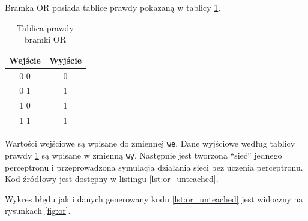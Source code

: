 \documentclass[pointlessnumbers, abstracton, headsepline, a4paper]{scrartcl}
\begin{document}
Bramka OR posiada tablice prawdy pokazaną w tablicy \ref{tab:or}.

\begin{table}[h]
\centering
\begin{tabular}[t]{c|c}
Wejście & Wyjście \\
\hline
0 0 & 0 \\
0 1 & 1 \\
1 0 & 1 \\
1 1 & 1 \\
\end{tabular}
\caption{\label{tab:or}Tablica prawdy bramki OR}
\end{table}

Wartości wejściowe są wpisane do zmiennej \texttt{we}. Dane wyjściowe według tablicy prawdy \ref{tab:or} są wpisane w zmienną \texttt{wy}. Następnie jest tworzona ``sieć'' jednego perceptronu i przeprowadzona symulacja działania sieci bez uczenia perceptronu. Kod źródłowy jest dostępny w listingu \ref{lst:or_unteached}.

\begin{center}
\begin{minipage}{0.5\textwidth}
\lstset{captionpos=b,caption=Kod nie uczonej bramki OR,label=lst:or_unteached}

\end{minipage}
\end{center}

Wykres błędu jak i danych generowany kodu \ref{lst:or_unteached} jest widoczny na rysunkach \ref{fig:or}.
\end{document}
